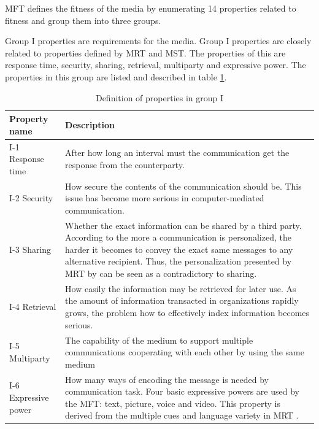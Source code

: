 \documentclass[english,12pt,a4paper,pdftex]{article}
\begin{document}
\ac{MFT} defines the fitness of the media by enumerating 14 properties related to fitness and group them into three groups. 

Group I properties are requirements for the media. Group I properties are closely related to properties defined by \ac{MRT} and \ac{MST}. The properties of this are response time, security, sharing, retrieval, multiparty and expressive power. The properties in this group are listed and described in table \ref{table:mft_group1}.

\begin{table}[!h]
\renewcommand{\arraystretch}{1.3}
\caption{Definition of properties in group I}
\label{table:mft_group1}
\centering
\begin{tabular}{|p{4cm}|p{10cm}|}
\hline
\textbf{Property name} & \textbf{Description}\\
\hline
I-1 Response time & After how long an interval must the communication get the response from the counterparty. \\
\hline
I-2 Security & How secure the contents of the communication should be. This issue has become more serious in computer-mediated communication. \\
\hline
I-3 Sharing & Whether the exact information can be shared by a third party. According to \citet{higa2007} the more a communication is personalized, the harder it becomes to convey the exact same messages to any alternative recipient. Thus, the personalization presented by \ac{MRT} by \citet{daft1986} can be seen as a contradictory to sharing. \\
\hline
I-4 Retrieval & How easily the information may be retrieved for later use. As the amount of information transacted in organizations rapidly grows, the problem how to effectively index information becomes serious. \\
\hline
I-5 Multiparty & The capability of the medium to support multiple communications cooperating with each other by using the same medium \\
\hline
I-6 Expressive power & How many ways of encoding the message is needed by communication task. Four basic expressive powers are used by the \ac{MFT}: text, picture, voice and video. This property is derived from the multiple cues and language variety in MRT \citep{daft1986}. \\
\hline
\end{tabular}
\end{table}
\end{document}
